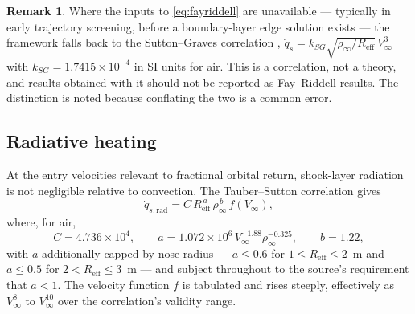 \documentclass[11pt,a4paper]{article}
\theoremstyle{definition}
\newtheorem{remark}[theorem]{Remark}
\numberwithin{equation}{section}
\begin{document}
\begin{remark}
Where the inputs to \cref{eq:fayriddell} are unavailable --- typically in early trajectory screening, before a boundary-layer edge solution exists --- the framework falls back to the Sutton--Graves correlation \cite{sutton1971}, $\dot{q}_s = k_{SG}\sqrt{\rho_\infty/R_{\text{eff}}}\,V_\infty^3$ with $k_{SG} = 1.7415\times10^{-4}$ in SI units for air. This is a correlation, not a theory, and results obtained with it should not be reported as Fay--Riddell results. The distinction is noted because conflating the two is a common error.
\end{remark}

\subsection{Radiative heating}
\label{sec:radiative}

At the entry velocities relevant to fractional orbital return, shock-layer radiation is not negligible relative to convection. The Tauber--Sutton correlation \cite{tauber1991} gives
\begin{equation}
\label{eq:tauber}
\dot{q}_{s,\text{rad}} = C\, R_{\text{eff}}^{\,a}\, \rho_\infty^{\,b}\, f(V_\infty),
\end{equation}
where, for air,
\begin{equation}
\label{eq:tauberconst}
C = 4.736\times10^{4},
\qquad
a = 1.072\times10^{6}\, V_\infty^{-1.88}\rho_\infty^{-0.325},
\qquad
b = 1.22,
\end{equation}
with $a$ additionally capped by nose radius --- $a \le 0.6$ for $1 \le R_{\text{eff}} \le 2$~m and $a \le 0.5$ for $2 < R_{\text{eff}} \le 3$~m --- and subject throughout to the source's requirement that $a < 1$. The velocity function $f$ is tabulated and rises steeply, effectively as $V_\infty^{8}$ to $V_\infty^{10}$ over the correlation's validity range.
\end{document}
